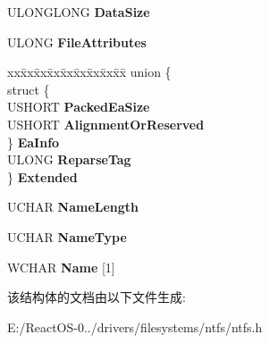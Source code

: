 \begin{DoxyCompactItemize}
U\+L\+O\+N\+G\+L\+O\+NG {\bfseries Data\+Size}
\item 
\mbox{\label{struct_f_i_l_e_n_a_m_e___a_t_t_r_i_b_u_t_e_a88fafae585286f0efcad090aa8a73885}} 
U\+L\+O\+NG {\bfseries File\+Attributes}
\item 
\mbox{\label{struct_f_i_l_e_n_a_m_e___a_t_t_r_i_b_u_t_e_aa031d1d3196c11fb21e0ae0058796f72}} 
\begin{tabbing}
xx\=xx\=xx\=xx\=xx\=xx\=xx\=xx\=xx\=\kill
union \{\\
\>struct \{\\
\>\>USHORT {\bfseries PackedEaSize}\\
\>\>USHORT {\bfseries AlignmentOrReserved}\\
\>\} {\bfseries EaInfo}\\
\>ULONG {\bfseries ReparseTag}\\
\} {\bfseries Extended}\\

\end{tabbing}\item 
\mbox{\label{struct_f_i_l_e_n_a_m_e___a_t_t_r_i_b_u_t_e_a1feb010df0f3ca53cfc0cd13c2eedb76}} 
U\+C\+H\+AR {\bfseries Name\+Length}
\item 
\mbox{\label{struct_f_i_l_e_n_a_m_e___a_t_t_r_i_b_u_t_e_a43ab0db705964015ab398e8db21c69dc}} 
U\+C\+H\+AR {\bfseries Name\+Type}
\item 
\mbox{\label{struct_f_i_l_e_n_a_m_e___a_t_t_r_i_b_u_t_e_abc0c1ab890d65f4978172f5e575993d2}} 
W\+C\+H\+AR {\bfseries Name} \mbox{[}1\mbox{]}
\end{DoxyCompactItemize}


该结构体的文档由以下文件生成\+:\begin{DoxyCompactItemize}
\item 
E\+:/\+React\+O\+S-\/0../drivers/filesystems/ntfs/ntfs.\+h\end{DoxyCompactItemize}

